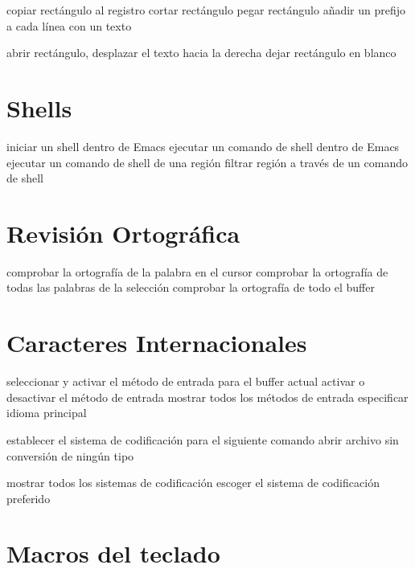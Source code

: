  copiar rect{\'a}ngulo al registro
 cortar rect{\'a}ngulo
 pegar rect{\'a}ngulo
 a{\~n}adir un prefijo a cada l{\'i}nea con un texto

 abrir rect{\'a}ngulo, desplazar el texto hacia la derecha
 dejar rect{\'a}ngulo en blanco

\section{Shells}

 iniciar un shell dentro de Emacs
 ejecutar un comando de shell dentro de Emacs
 ejecutar un comando de shell de una regi{\'o}n
 filtrar regi{\'o}n a trav{\'e}s de un comando de shell

\section{Revisi{\'o}n Ortogr{\'a}fica}

 comprobar la ortograf{\'i}a de la palabra en el cursor
 comprobar la ortograf{\'i}a de todas las palabras de
  la selecci{\'o}n
 comprobar la ortograf{\'i}a de todo el buffer

\section{Caracteres Internacionales}

 seleccionar y activar el m{\'e}todo de entrada para el
  buffer actual
 activar o desactivar el m{\'e}todo de entrada
 mostrar todos los m{\'e}todos de entrada
 especificar idioma principal

 establecer el sistema de codificaci{\'o}n para el siguiente comando
 abrir archivo sin conversi{\'o}n
  de ning{\'u}n tipo

 mostrar todos los sistemas de codificaci{\'o}n
 escoger el sistema de codificaci{\'o}n preferido

\section{Macros del teclado}


